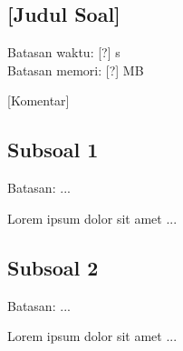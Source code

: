 \begin{center}
    \section*{[Judul Soal]} %
    \vspace*{-0.4cm}
    Batasan waktu: [?] s\\
    Batasan memori: [?] MB %
\end{center}

[Komentar] %

\subsection*{Subsoal 1}
Batasan: $...$ %

Lorem ipsum dolor sit amet ... %

\subsection*{Subsoal 2}
Batasan: $...$ %

Lorem ipsum dolor sit amet ... %
